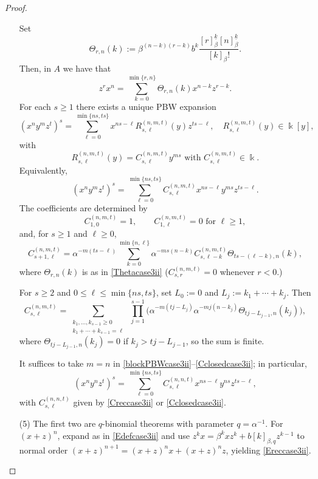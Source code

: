 \documentclass{amsart}
\theoremstyle{definition}
\theoremstyle{remark}
\numberwithin{equation}{section}
\begin{document}
\begin{proof}
\begin{enumerate}
Set
\begin{equation}\label{Thetacase3ii}
\Theta_{r,n}(k):=\beta^{(n-k)(r-k)}b^{k} \frac{[r]^{\underline{k}}_{\beta}[n]^{\underline{k}}_{\beta}}{[k]_{\beta}!}.
\end{equation}
Then, in $A$ we have that
\begin{equation}\label{zrxncase3ii}
z^{r}x^{n}=\sum_{k=0}^{\min\{r,n\}}\Theta_{r,n}(k) x^{n-k}z^{r-k}.
\end{equation}
For each $s\ge 1$ there exists a unique PBW expansion
\begin{equation}\label{blockPBWcase3ii_poly}
(x^{n}y^{m}z^{t})^{s}=\sum_{\ell=0}^{\min\{ns,ts\}}x^{ns-\ell}R^{(n,m,t)}_{s,\ell}(y) z^{ts-\ell}, \quad R^{(n,m,t)}_{s,\ell}(y)\in\Bbbk[y],
\end{equation}
with
\[
R^{(n,m,t)}_{s,\ell}(y)=C^{(n,m,t)}_{s,\ell} y^{ms} \text{ with } C^{(n,m,t)}_{s,\ell}\in\Bbbk.
\]
Equivalently,
\begin{equation}\label{blockPBWcase3ii}
(x^{n}y^{m}z^{t})^{s}=\sum_{\ell=0}^{\min\{ns,ts\}}C^{(n,m,t)}_{s,\ell} x^{ns-\ell}y^{ms}z^{ts-\ell}.
\end{equation}
The coefficients are determined by
\[
C^{(n,m,t)}_{1,0}=1,\qquad C^{(n,m,t)}_{1,\ell}=0 \text{ for } \ell\ge 1,
\]
and, for $s\ge 1$ and $\ell\ge 0$,
\begin{equation}\label{Creccase3ii}
C^{(n,m,t)}_{s+1,\ell}
=\alpha^{-m(ts-\ell)}\sum_{k=0}^{\min\{n,\ell\}}
\alpha^{-ms(n-k)} C^{(n,m,t)}_{s,\ell-k} \Theta_{ts-(\ell-k),n}(k),
\end{equation}
where $\Theta_{r,n}(k)$ is as in \eqref{Thetacase3ii} ($C^{(n,m,t)}_{s,r}=0$ whenever $r<0$.)

For $s\ge 2$ and $0\le \ell\le \min\{ns,ts\}$, set $L_0:=0$ and $L_j:=k_1+\cdots+k_j$.
Then
\begin{equation}\label{Cclosedcase3ii}
C^{(n,m,t)}_{s,\ell}
=\sum_{\substack{k_1,\dots,k_{s-1}\ge 0\\ k_1+\cdots+k_{s-1}=\ell}}
\ \prod_{j=1}^{s-1}\Big(\alpha^{-m(tj-L_j)}\alpha^{-m j (n-k_j)} \Theta_{tj-L_{j-1},n}(k_j)\Big),
\end{equation}
where $\Theta_{tj-L_{j-1},n}(k_j)=0$ if $k_j>tj-L_{j-1}$, so the sum is finite.

It suffices to take $m=n$ in \eqref{blockPBWcase3ii}--\eqref{Cclosedcase3ii}; in particular,
\[
(x^{n}y^{n}z^{t})^{s}=\sum_{\ell=0}^{\min\{ns,ts\}}C^{(n,n,t)}_{s,\ell} x^{ns-\ell}y^{ns}z^{ts-\ell},
\]
with $C^{(n,n,t)}_{s,\ell}$ given by \eqref{Creccase3ii} or \eqref{Cclosedcase3ii}.

\item [\rm (5)] The first two are $q$-binomial theorems with parameter $q=\alpha^{-1}$.
For $(x+z)^n$, expand as in \eqref{Edefcase3ii} and use $z^k x=\beta^k x z^k+b[k]_{\beta,q}z^{k-1}$ to normal order $(x+z)^{n+1}=(x+z)^n x+(x+z)^n z$, yielding \eqref{Ereccase3ii}.
\end{enumerate}
\end{proof}
\end{document}
